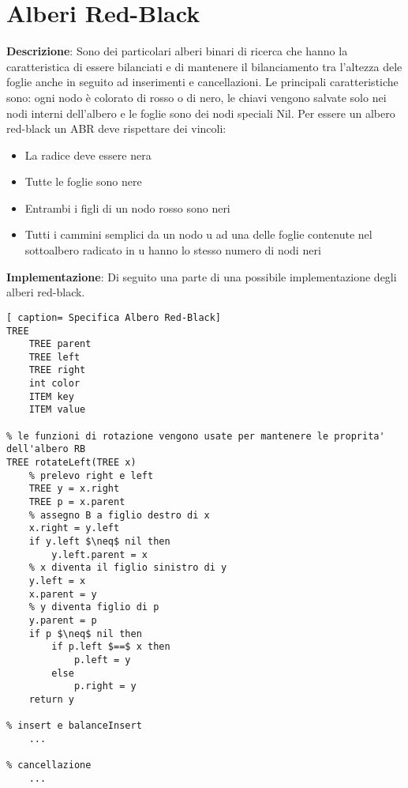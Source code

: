 \documentclass[../cheatSheetAlgoritmi.tex]{subfiles}
\begin{document}
\section{Alberi Red-Black}
\textbf{Descrizione}: Sono dei particolari alberi binari di ricerca che hanno la caratteristica di essere bilanciati e di mantenere il bilanciamento tra l'altezza dele foglie anche in seguito ad inserimenti e cancellazioni. Le principali caratteristiche sono: ogni nodo è colorato di rosso o di nero, le chiavi vengono salvate solo nei nodi interni dell'albero e le foglie sono dei nodi speciali Nil. Per essere un albero red-black un ABR deve rispettare dei vincoli:
\begin{itemize}
 	\item La radice deve essere nera
 	\item Tutte le foglie sono nere
 	\item Entrambi i figli di un nodo rosso sono neri
 	\item Tutti i cammini semplici da un nodo u ad una delle foglie contenute nel sottoalbero radicato in u hanno lo stesso numero di nodi neri
\end{itemize}
\textbf{Implementazione}: Di seguito una parte di una possibile implementazione degli alberi red-black.
\begin{lstlisting}[ caption= Specifica Albero Red-Black]
TREE
	TREE parent
	TREE left
	TREE right
	int color
	ITEM key
	ITEM value

% le funzioni di rotazione vengono usate per mantenere le proprita' dell'albero RB	
TREE rotateLeft(TREE x)
	% prelevo right e left
	TREE y = x.right
	TREE p = x.parent
	% assegno B a figlio destro di x
	x.right = y.left 
	if y.left $\neq$ nil then
		y.left.parent = x
	% x diventa il figlio sinistro di y
	y.left = x
	x.parent = y
	% y diventa figlio di p
	y.parent = p
	if p $\neq$ nil then
		if p.left $==$ x then
			p.left = y
		else
			p.right = y
	return y
  	
% insert e balanceInsert 
	...
	
% cancellazione
	...
\end{lstlisting}
\end{document}
